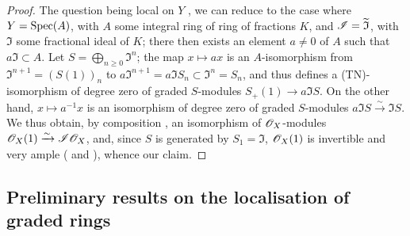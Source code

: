 \begin{proof}
The question being local on $Y$ , we can reduce to the case where $Y=\operatorname{Spec}(A)$, with $A$ some integral ring of ring of fractions $K$, and $\mathscr{I}=\widetilde{\mathfrak{I}}$, with $\mathfrak{I}$ some fractional ideal of $K$;
there then exists an element $a\neq0$ of $A$ such that $a\mathfrak{I}\subset A$.
Let $S = \bigoplus_{n\geq0}\mathfrak{I}^n$;
the map $x\mapsto ax$ is an $A$-isomorphism from $\mathfrak{I}^{n+1} = (S(1))_n$ to $a\mathfrak{I}^{n+1} = a\mathfrak{I}S_n \subset \mathfrak{I}^n = S_n$,
and thus defines a (TN)-isomorphism of degree zero of graded $S$-modules $S_+(1)\to a\mathfrak{I}S$.
On the other hand, $x\mapsto a^{-1}x$ is an isomorphism of degree zero of graded $S$-modules $a\mathfrak{I}S \xrightarrow{\sim} \mathfrak{I}S$.
We thus obtain, by composition , an isomorphism of $\mathscr{O}_X$-modules $\mathscr{O}_X(1) \xrightarrow{\sim} \mathscr{I}\mathscr{O}_X$, and, since $S$ is generated by $S_1=\mathfrak{I}$, $\mathscr{O}_X(1)$ is invertible  and very ample ( and ), whence our claim.
\end{proof}


\subsection{Preliminary results on the localisation of graded rings}
\label{subsection:II.8.2}

